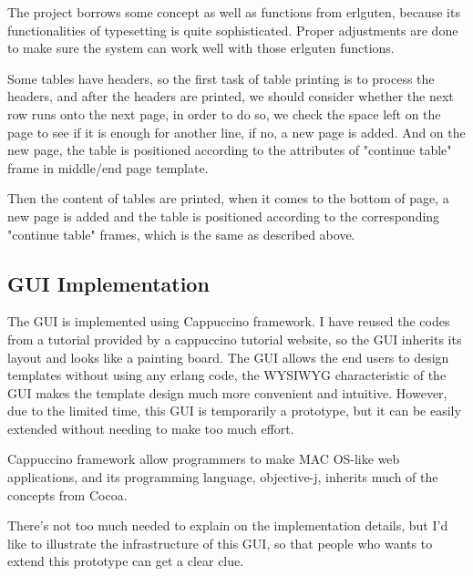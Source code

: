 \documentclass[12pt,twoside,a4paper]{report}
\begin{document}
  The project borrows some concept as well as functions from erlguten, because its functionalities of typesetting is quite sophisticated. Proper adjustments are done to make sure the system can work well with those erlguten functions.

  Some tables have headers, so the first task of table printing is to process the headers, and after the headers are printed, we should consider whether the next row runs onto the next page, in order to do so, we check the space left on the page to see if it is enough for another line, if no, a new page is added. And on the new page, the table is positioned according to the attributes of "continue table" frame in middle/end page template. 

  Then the content of tables are printed, when it comes to the bottom of page, a new page is added and the table is positioned according to the corresponding "continue table" frames, which is the same as described above.  

\subsection{GUI Implementation}

  The GUI is implemented using Cappuccino framework\cite{capp}. I have reused the codes from a tutorial provided by a cappuccino tutorial website\cite{tut}, so the GUI inherits its layout and looks like a painting board. The GUI allows the end users to design templates without using any erlang code, the WYSIWYG characteristic of the GUI makes the template design much more convenient and intuitive. However, due to the limited time, this GUI is temporarily a prototype, but it can be easily extended without needing to make too much effort. 

  Cappuccino framework allow programmers to make MAC OS-like web applications, and its programming language, objective-j, inherits much of the concepts from Cocoa. 

  There's not too much needed to explain on the implementation details, but I'd like to illustrate the infrastructure of this GUI, so that people who wants to extend this prototype can get a clear clue. 
\end{document}
